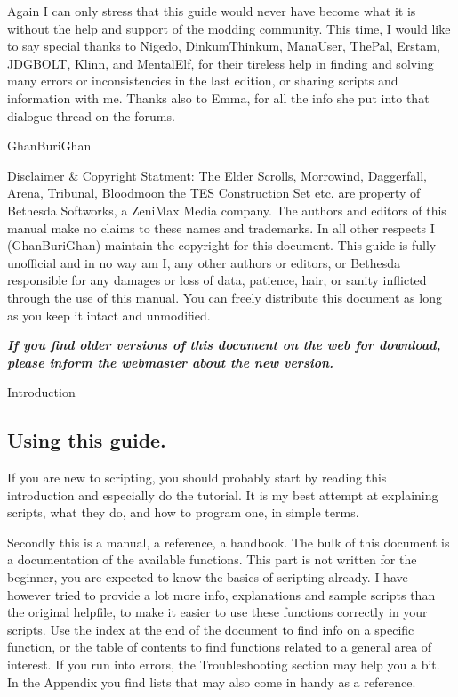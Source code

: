 \documentclass[
]{article}
\begin{document}
Again I can only stress that this guide would never have become what it
is without the help and support of the modding community. This time, I
would like to say special thanks to Nigedo, DinkumThinkum, ManaUser,
ThePal, Erstam, JDGBOLT, Klinn, and MentalElf, for their tireless help
in finding and solving many errors or inconsistencies in the last
edition, or sharing scripts and information with me. Thanks also to
Emma, for all the info she put into that dialogue thread on the forums.

GhanBuriGhan

Disclaimer \& Copyright Statment: The Elder Scrolls, Morrowind,
Daggerfall, Arena, Tribunal, Bloodmoon the TES Construction Set etc. are
property of Bethesda Softworks, a ZeniMax Media company. The authors and
editors of this manual make no claims to these names and trademarks. In
all other respects I (GhanBuriGhan) maintain the copyright for this
document. This guide is fully unofficial and in no way am I, any other
authors or editors, or Bethesda responsible for any damages or loss of
data, patience, hair, or sanity inflicted through the use of this
manual. You can freely distribute this document as long as you keep it
intact and unmodified.

\emph{\textbf{If you find older versions of this document on the web for
download, please inform the webmaster about the new version.}}

\protect\hypertarget{_Toc53412549}{}{}Introduction

\hypertarget{using-this-guide.}{%
\subsection{Using this guide.}\label{using-this-guide.}}

If you are new to scripting, you should probably start by reading this
introduction and especially do the tutorial. It is my best attempt at
explaining scripts, what they do, and how to program one, in simple
terms.

Secondly this is a manual, a reference, a handbook. The bulk of this
document is a documentation of the available functions. This part is not
written for the beginner, you are expected to know the basics of
scripting already. I have however tried to provide a lot more info,
explanations and sample scripts than the original helpfile, to make it
easier to use these functions correctly in your scripts. Use the index
at the end of the document to find info on a specific function, or the
table of contents to find functions related to a general area of
interest. If you run into errors, the Troubleshooting section may help
you a bit. In the Appendix you find lists that may also come in handy as
a reference.
\end{document}
